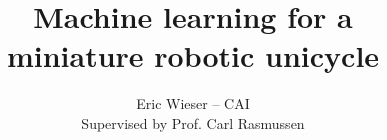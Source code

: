 \documentclass[12pt,a4paper]{article}
\begin{document}
	\author{Eric Wieser -- CAI\\Supervised by Prof. Carl Rasmussen}
	\title{Machine learning for a\\miniature robotic unicycle}
	\maketitle

	\begin{abstract}
		
	\end{abstract}
\end{document}
